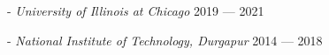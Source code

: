  - \textit{University of Illinois at Chicago}	\hfill 2019 --- 2021

 - \textit{National Institute of Technology, Durgapur} \hfill 2014 --- 2018

